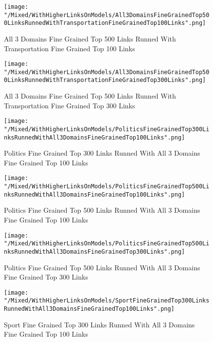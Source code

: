\documentclass[thesis=M,english]{FITthesis}[2012/10/20]
\begin{document}
	\begin{figure}\centering
		\texttt{[image: "/Mixed/WithHigherLinksOnModels/All3DomainsFineGrainedTop500LinksRunnedWithTransportationFineGrainedTop100Links".png]}
		\caption{All 3 Domains Fine Grained Top 500 Links Runned With Transportation Fine Grained Top 100 Links}\label{}
	\end{figure}	
	
	\begin{figure}\centering
		\texttt{[image: "/Mixed/WithHigherLinksOnModels/All3DomainsFineGrainedTop500LinksRunnedWithTransportationFineGrainedTop300Links".png]}
		\caption{All 3 Domains Fine Grained Top 500 Links Runned With Transportation Fine Grained Top 300 Links}\label{}
	\end{figure}	
	
	\begin{figure}\centering
		\texttt{[image: "/Mixed/WithHigherLinksOnModels/PoliticsFineGrainedTop300LinksRunnedWithAll3DomainsFineGrainedTop100Links".png]}
		\caption{Politics Fine Grained Top 300 Links Runned With All 3 Domains Fine Grained Top 100 Links}\label{}
	\end{figure}	
	
	\begin{figure}\centering
		\texttt{[image: "/Mixed/WithHigherLinksOnModels/PoliticsFineGrainedTop500LinksRunnedWithAll3DomainsFineGrainedTop100Links".png]}
		\caption{Politics Fine Grained Top 500 Links Runned With All 3 Domains Fine Grained Top 100 Links}\label{}
	\end{figure}
	
	\begin{figure}\centering
		\texttt{[image: "/Mixed/WithHigherLinksOnModels/PoliticsFineGrainedTop500LinksRunnedWithAll3DomainsFineGrainedTop300Links".png]}
		\caption{Politics Fine Grained Top 500 Links Runned With All 3 Domains Fine Grained Top 300 Links}\label{}
	\end{figure}
	
	\begin{figure}\centering
		\texttt{[image: "/Mixed/WithHigherLinksOnModels/SportFineGrainedTop300LinksRunnedWithAll3DomainsFineGrainedTop100Links".png]}
		\caption{Sport Fine Grained Top 300 Links Runned With All 3 Domains Fine Grained Top 100 Links}\label{}
	\end{figure}
%	
	
\end{document}
